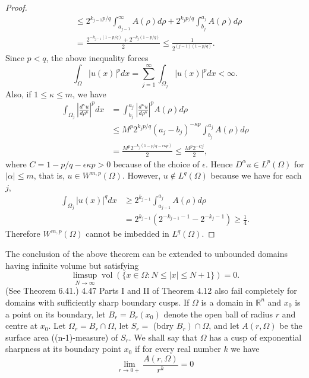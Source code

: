 \begin{proof}
\[\begin{aligned}
  & \leq 2^{k_{j-1} p / q} \int_{a_{j-1}}^{\infty} A(\rho) d \rho+2^{k_j p / q} \int_{b_j}^{a_j} A(\rho) d \rho \\
  & =\frac{2^{-k_{j-1}(1-p / q)}+2^{-k_j(1-p / q)}}{2} \leq \frac{1}{2^{(j-1)(1-p / q)}} .
  \end{aligned}
  \]
  Since $p<q$, the above inequality forces
  \[
  \int_{\Omega}|u(x)|^p d x=\sum_{j=1}^{\infty} \int_{\Omega_j}|u(x)|^p d x<\infty .
  \]
  Also, if $1 \leq \kappa \leq m$, we have
  \[
  \begin{aligned}
  \int_{\Omega_j}\left|\frac{d^\kappa u}{d \rho^\kappa}\right|^p d x & =\int_{b_j}^{a_j}\left|\frac{d^\kappa u}{d \rho^\kappa}\right|^p A(\rho) d \rho \\
  & \leq M^p 2^{k_j p / q}\left(a_j-b_j\right)^{-\kappa p} \int_{b_j}^{a_j} A(\rho) d \rho \\
  & =\frac{M^p 2^{-k_j(1-p / q-\epsilon \kappa p)}}{2} \leq \frac{M^p 2^{-C j}}{2},
  \end{aligned}
  \]
  where $C=1-p / q-\epsilon \kappa p>0$ because of the choice of $\epsilon$. Hence $D^\alpha u \in L^p(\Omega)$ for $|\alpha| \leq m$, that is, $u \in W^{m, p}(\Omega)$. However, $u \notin L^q(\Omega)$ because we have for each $j$,
  \[
  \begin{aligned}
  \int_{\Omega_j}|u(x)|^q d x & \geq 2^{k_{j-1}} \int_{a_{j-1}}^{a_j} A(\rho) d \rho \\
  & =2^{k_{j-1}}\left(2^{-k_{j-1}-1}-2^{-k_j-1}\right) \geq \frac{1}{4} .
  \end{aligned}
  \]
  Therefore $W^{m, p}(\Omega)$ cannot be imbedded in $L^q(\Omega)$.
\end{proof}

The conclusion of the above theorem can be extended to unbounded domains having infinite volume but satisfying
\[
\limsup _{N \rightarrow \infty} \operatorname{vol}(\{x \in \Omega: N \leq|x| \leq N+1\})=0 .
\]
(See Theorem 6.41.)
4.47 Parts I and II of Theorem 4.12 also fail completely for domains with sufficiently sharp boundary cusps. If $\Omega$ is a domain in $\mathbb{R}^n$ and $x_0$ is a point on its boundary, let $B_r=B_r\left(x_0\right)$ denote the open ball of radius $r$ and centre at $x_0$. Let $\Omega_r=B_r \cap \Omega$, let $S_r=$ (bdry $\left.B_r\right) \cap \Omega$, and let $A(r, \Omega)$ be the surface area ((n-1)-measure) of $S_r$. We shall say that $\Omega$ has a cusp of exponential sharpness
at its boundary point $x_0$ if for every real number $k$ we have
\[
\lim _{r \rightarrow 0+} \frac{A(r, \Omega)}{r^k}=0
\]



